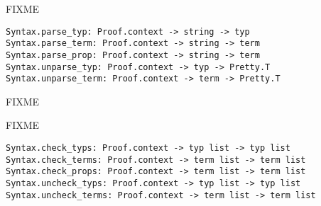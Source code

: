 \begin{isabellebody}
\begin{isamarkuptext}
\begin{description}
  \end{description}%
\end{isamarkuptext}%
\isamarkuptrue%
%
\endisatagmlref
{\isafoldmlref}%
%
\isadelimmlref
%
\endisadelimmlref
%
\isamarkuptrue%
%
\begin{isamarkuptext}%
FIXME%
\end{isamarkuptext}%
\isamarkuptrue%
%
\isadelimmlref
%
\endisadelimmlref
%
\isatagmlref
%
\begin{isamarkuptext}%
\begin{mldecls}
  \verb|Syntax.parse_typ: Proof.context -> string -> typ| \\
  \verb|Syntax.parse_term: Proof.context -> string -> term| \\
  \verb|Syntax.parse_prop: Proof.context -> string -> term| \\
  \verb|Syntax.unparse_typ: Proof.context -> typ -> Pretty.T| \\
  \verb|Syntax.unparse_term: Proof.context -> term -> Pretty.T| \\
  \end{mldecls}

  \begin{description}

  \item FIXME

  \end{description}%
\end{isamarkuptext}%
\isamarkuptrue%
%
\endisatagmlref
{\isafoldmlref}%
%
\isadelimmlref
%
\endisadelimmlref
%
\isamarkuptrue%
%
\begin{isamarkuptext}%
FIXME%
\end{isamarkuptext}%
\isamarkuptrue%
%
\isadelimmlref
%
\endisadelimmlref
%
\isatagmlref
%
\begin{isamarkuptext}%
\begin{mldecls}
  \verb|Syntax.check_typs: Proof.context -> typ list -> typ list| \\
  \verb|Syntax.check_terms: Proof.context -> term list -> term list| \\
  \verb|Syntax.check_props: Proof.context -> term list -> term list| \\
  \verb|Syntax.uncheck_typs: Proof.context -> typ list -> typ list| \\
  \verb|Syntax.uncheck_terms: Proof.context -> term list -> term list| \\
  \end{mldecls}


\end{isamarkuptext}
\end{isabellebody}
